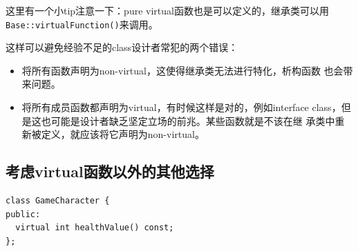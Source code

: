 \documentclass[a4paper,twoside]{article}
\theoremstyle{definition}
\theoremstyle{remark}
\numberwithin{equation}{section}
\let\OldTexttt\texttt
\renewcommand{\texttt}[1]{{\color{blue} \OldTexttt{#1}}}
\begin{document}
这里有一个小tip注意一下：pure virtual函数也是可以定义的，继承类可以用
\texttt{Base::virtualFunction()}来调用。

这样可以避免经验不足的class设计者常犯的两个错误：
\begin{itemize}
\item 将所有函数声明为non-virtual，这使得继承类无法进行特化，析构函数
  也会带来问题。
\item 将所有成员函数都声明为virtual，有时候这样是对的，例如interface
  class，但是这也可能是设计者缺乏坚定立场的前兆。某些函数就是不该在继
  承类中重新被定义，就应该将它声明为non-virtual。
\end{itemize}


\subsection{考虑virtual函数以外的其他选择}
\label{sec:Item-35}

\begin{verbatim}
class GameCharacter {
public:
  virtual int healthValue() const;
};
\end{verbatim}
\end{document}
